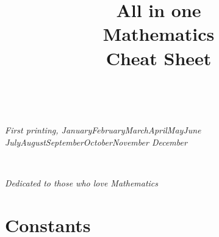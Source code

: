 \documentclass{tufte-book}
\title{All in one\\ Mathematics\\\quad Cheat Sheet}
\newcommand{\monthyear}{%
  \ifcase\month\or January\or February\or March\or April\or May\or June\or
  July\or August\or September\or October\or November\or
  December\fi\space\number\year
}
\begin{document}
\frontmatter

\maketitle

\newpage

\begin{fullwidth}
~\vfill
\thispagestyle{empty}
\setlength{\parindent}{0pt}
\setlength{\parskip}{\baselineskip}


\par{}


\par\textit{First printing, \monthyear}
\end{fullwidth}

\tableofcontents

\listoffigures
\listoftables


\cleardoublepage
\cleardoublepage
~\vfill
\begin{doublespace}
\noindent\fontsize{18}{22}\selectfont\itshape
\nohyphenation
Dedicated to those who love Mathematics
\end{doublespace}
\vfill
\vfill

\cleardoublepage

\chapter{Constants}
\end{document}
